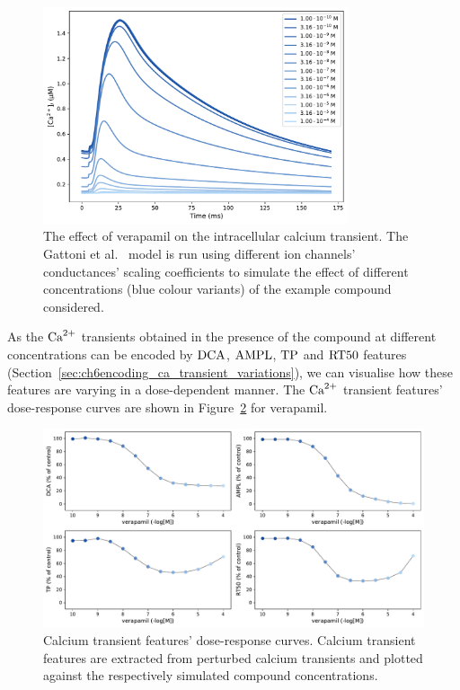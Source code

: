 \begin{figure}[ht!]
    \myfloatalign
    \includegraphics[width=0.8\textwidth]{figures/chapter06/verapamil_calcium_curve_drug.pdf}
    \caption{The effect of verapamil on the intracellular calcium transient. The Gattoni et al.~\cite{Gattoni:2017} model is run using different ion channels' conductances' scaling coefficients to simulate the effect of different concentrations (blue colour variants) of the example compound considered.}
    \label{fig:calciumverapamil}
\end{figure}

\vspace{0.2cm}
As the $\textrm{Ca}^{2+}$ transients obtained in the presence of the compound at different concentrations can be encoded by $\textrm{DCA}$, $\textrm{AMPL}$, $\textrm{TP}$ and $\textrm{RT50}$ features (Section~\ref{sec:ch6encoding_ca_transient_variations}), we can visualise how these features are varying in a dose-dependent manner. The $\textrm{Ca}^{2+}$ transient features' dose-response curves are shown in Figure~\ref{fig:cafeatsverapamilrespcurve} for verapamil.

\begin{figure}[ht!]
    \myfloatalign
    \includegraphics[width=\textwidth]{figures/chapter06/verapamil_dose_calcium_response_curve_drug.pdf}
    \caption{Calcium transient features' dose-response curves. Calcium transient features are extracted from perturbed calcium transients and plotted against the respectively simulated compound concentrations.}
    \label{fig:cafeatsverapamilrespcurve}
\end{figure}

